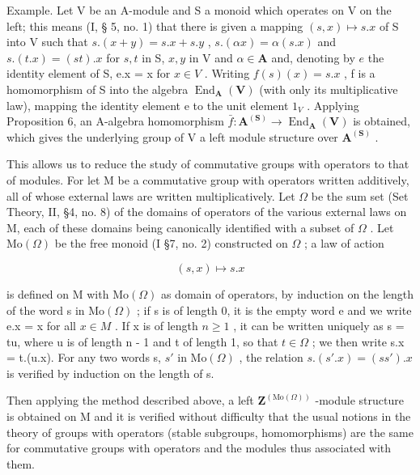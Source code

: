 Example. Let V be an A-module and S a monoid which operates on V on the left; this means (I, § 5, no. 1) that there is given a mapping \((s, x) \mapsto s.x\) of S into V such that \(s.(x + y) = s.x + s.y\) , \(s.(\alpha x) = \alpha(s.x)\) and \(s.(t.x) = (st).x\) for \(s, t\) in S, \(x, y\) in V and \(\alpha \in \mathbf{A}\) and, denoting by \(e\) the identity element of S, e.x = x for \(x \in V\) . Writing \(f(s)(x) = s.x\) , f is a homomorphism of S into the algebra \(\operatorname{End}_{\mathbf{A}}(\mathbf{V})\) (with only its multiplicative law), mapping the identity element e to the unit element \(1_{V}\) . Applying Proposition 6, an A-algebra homomorphism \(\bar{f}: \mathbf{A}^{(\mathbf{S})} \to \operatorname{End}_{\mathbf{A}}(\mathbf{V})\) is obtained, which gives the underlying group of V a left module structure over \(\mathbf{A}^{(\mathbf{S})}\) .

This allows us to reduce the study of commutative groups with operators to that of modules. For let M be a commutative group with operators written additively, all of whose external laws are written multiplicatively. Let \(\Omega\) be the sum set (Set Theory, II, §4, no. 8) of the domains of operators of the various external laws on M, each of these domains being canonically identified with a subset of \(\Omega\) . Let \(\mathrm{Mo}(\Omega)\) be the free monoid (I §7, no. 2) constructed on \(\Omega\) ; a law of action

\[
(s, x) \mapsto s. x
\]

is defined on M with \(\mathrm{Mo}(\Omega)\) as domain of operators, by induction on the length of the word s in \(\mathrm{Mo}(\Omega)\) ; if s is of length 0, it is the empty word e and we write e.x = x for all \(x \in M\) . If x is of length \(n \geqslant 1\) , it can be written uniquely as s = tu, where u is of length n - 1 and t of length 1, so that \(t \in \Omega\) ; we then write s.x = t.(u.x). For any two words s, \(s'\) in \(\mathrm{Mo}(\Omega)\) , the relation \(s.(s'.x) = (ss').x\) is verified by induction on the length of s.

Then applying the method described above, a left \(\mathbf{Z}^{(\mathrm{Mo}(\Omega))}\) -module structure is obtained on M and it is verified without difficulty that the usual notions in the theory of groups with operators (stable subgroups, homomorphisms) are the same for commutative groups with operators and the modules thus associated with them.

